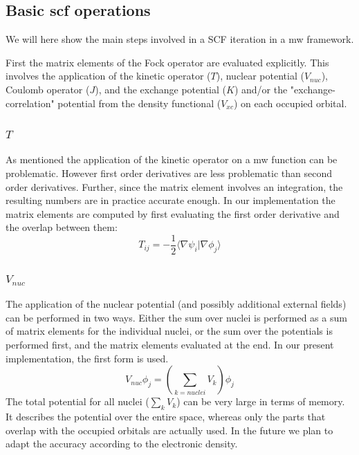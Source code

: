 \documentclass{article}
\begin{document}
\subsection{Basic scf operations} %

We will here show the main steps involved in a SCF iteration in a mw framework.

First the matrix elements of the Fock operator are evaluated explicitly. This involves the application of the kinetic operator ($T$), nuclear  potential ($V_{nuc}$), Coulomb operator ($J$), and  the exchange potential ($K$) and/or the "exchange-correlation" potential from the density functional ($V_{xc}$) on each occupied orbital.

\subsubsection{$T$}
As mentioned the application of the kinetic operator on a mw function can be problematic. However first order derivatives are less problematic than second order derivatives. Further, since the matrix element involves an integration, the resulting numbers are in practice accurate enough. 
In our implementation the matrix elements are computed by first evaluating the first order derivative and the overlap between them:
\begin{equation}
  T_{ij} = -\frac{1}{2} \langle \nabla \psi_i |\nabla {\phi_j}\rangle
\end{equation}


\subsubsection{$V_{nuc}$}

The application of the nuclear potential (and possibly additional external fields) can be performed in two ways. Either the sum over nuclei is performed as a sum of matrix elements for the individual nuclei, or the sum over the potentials is performed first, and the matrix elements evaluated at the end. In our present implementation, the first form is used.
\begin{equation}
  V_{nuc} \phi_j = (\sum_{k = nuclei} V_k) \phi_j
\end{equation}
The total potential for all nuclei ($\sum_{k} V_k$) can be very large in terms of memory. It describes the potential over the entire space, whereas only the parts that overlap with the occupied orbitals are actually used. In the future we plan to adapt the accuracy according to the electronic density.
\end{document}

